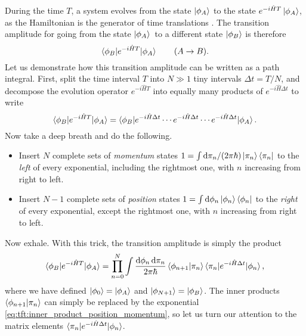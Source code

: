 During the time $T$, a system evolves from the state $\ket{\phi_A}$ to the state $e^{-i \hat{H} T} \ket{\phi_A}$, as the Hamiltonian is the generator of time translations \cite[equation 2.22]{ref:sakurai}.
The transition amplitude for going from the state $\ket{\phi_A}$ to a different state $\ket{\phi_B}$ is therefore
\begin{equation}
	\braket{\phi_B | e^{- i \hat{H} T} | \phi_A} \qquad (A \rightarrow B) .
	\label{eq:tft:transition_amplitude_intro}
\end{equation}
Let us demonstrate how this transition amplitude can be written as a path integral.
First, split the time interval $T$ into $N \gg 1$ tiny intervals $\Delta t = T / N$, and decompose the evolution operator $e^{- i \hat{H} T}$ into equally many products of $e^{- i \hat{H} \Delta t}$ to write
\newcommand\pointarrow[1]{\underset{\underset{\displaystyle #1}{\displaystyle \uparrow}}{}}
\begin{equation}
	\braket{\phi_B | e^{- i \hat{H} T} | \phi_A} = \braket{\phi_B | e^{- i \hat{H} \Delta t} \cdots e^{- i \hat{H} \Delta t} \cdots e^{- i \hat{H} \Delta t} | \phi_A} .
\end{equation}
Now take a deep breath and do the following.
\begin{itemize}
\item Insert $N$ complete sets of \emph{momentum} states $1 = \int \mathop{}\!\mathrm{d} \pi_n / (2 \pi \hbar) \ket{\pi_n} \bra{\pi_n}$ to the \emph{left} of every exponential, including the rightmost one, with $n$ increasing from right to left.
\item Insert $N-1$ complete sets of \emph{position} states $1 = \int \mathop{}\!\mathrm{d} \phi_n \ket{\phi_n} \bra{\phi_n}$ to the \emph{right} of every exponential, except the rightmost one, with $n$ increasing from right to left.
\end{itemize}
Now exhale.
With this trick, the transition amplitude is simply the product
\begin{equation}
	\braket{\phi_B | e^{- i \hat{H} T} | \phi_A} = \prod_{n=0}^{N} \int \frac{\mathop{}\!\mathrm{d} \phi_n \mathop{}\!\mathrm{d} \pi_n}{2 \pi \hbar} 
	             \braket{\phi_{n+1} | \pi_n} \braket{\pi_n | e^{- i \hat{H} \Delta t} | \phi_n} ,
\end{equation}
where we have defined $\ket{\phi_0} = \ket{\phi_A}$ and $\ket{\phi_{N+1}} = \ket{\phi_B}$.
The inner products $\braket{\phi_{n+1} | \pi_n}$ can simply be replaced by the exponential \eqref{eq:tft:inner_product_position_momentum}, so let us turn our attention to the matrix elements $\braket{\pi_n | e^{- i \hat{H} \Delta t} | \phi_n}$.
